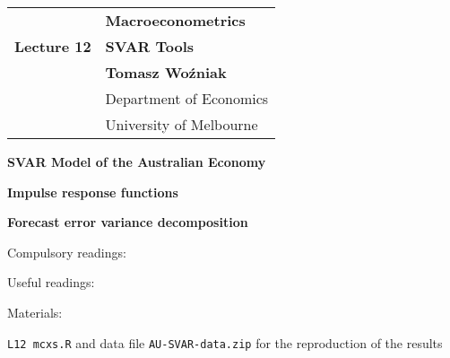 \documentclass[notes,blackandwhite,mathsans,usenames,dvipsnames]{beamer}
\begin{document}






{
\begin{frame}

\vspace{1cm}
\begin{tabular}{rl}
&\textbf{\LARGE\color{purple} Macroeconometrics}\\[8ex]
\textbf{\Large Lecture 12}&\textbf{\Large\color{mcxs2}SVAR Tools}\\[19ex]
&\textbf{Tomasz Wo\'zniak}\\[1ex]
&{\small\color{mcxs2} Department of Economics}\\
&{\small\color{mcxs2}University of Melbourne}
\end{tabular}

\end{frame}
}






{
\begin{frame}

\vspace{1cm}\textbf{\color{mcxs2}SVAR Model of the Australian Economy}

\bigskip\textbf{\color{purple}Impulse response functions}

\bigskip\textbf{\color{mcxs2}Forecast error variance decomposition}



\small
\vspace{1cm} Compulsory readings: \scriptsize



\small
\bigskip Useful readings: \scriptsize



\small
\bigskip Materials: \scriptsize

 \texttt{L12 mcxs.R} {\color{mcxs2}and data file} \texttt{AU-SVAR-data.zip} {\color{mcxs2}for the reproduction of the results}


\end{frame}
}
\end{document}
